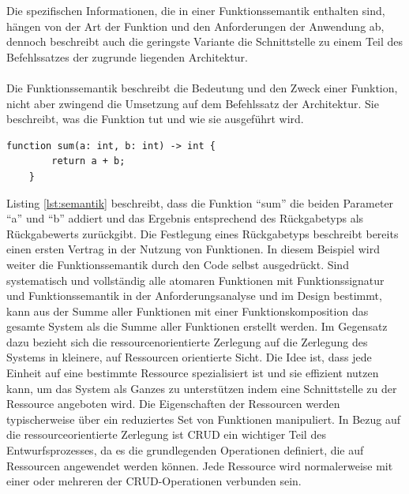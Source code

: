 \documentclass[../vs-script-first-v01.tex]{subfiles}
\begin{document}
Die spezifischen Informationen, die in einer Funktionssemantik enthalten sind, hängen von der Art der Funktion und den Anforderungen der Anwendung ab, dennoch beschreibt auch die geringste Variante die Schnittstelle zu einem Teil des Befehlssatzes der zugrunde liegenden Architektur. 
\\\\
Die Funktionssemantik beschreibt die Bedeutung und den Zweck einer Funktion, nicht aber zwingend die Umsetzung auf dem Befehlssatz der Architektur. Sie beschreibt, was die Funktion tut und wie sie ausgeführt wird. 
\begin{lstlisting}[caption={Funktionssemantik},captionpos=b,label={lst:semantik}]
    function sum(a: int, b: int) -> int {
        return a + b;
    }
\end{lstlisting}
Listing \ref{lst:semantik} beschreibt, dass die Funktion \enquote{sum} die beiden Parameter \enquote{a} und \enquote{b} addiert und das Ergebnis entsprechend des Rückgabetyps als Rückgabewerts zurückgibt. Die Festlegung eines Rückgabetyps beschreibt bereits einen ersten Vertrag in der Nutzung von Funktionen. In diesem Beispiel wird weiter die Funktionssemantik durch den Code selbst ausgedrückt. Sind systematisch und vollständig alle atomaren Funktionen mit Funktionssignatur und Funktionssemantik in der Anforderungsanalyse und im Design bestimmt, kann aus der Summe aller Funktionen mit einer Funktionskomposition das gesamte System als die Summe aller Funktionen erstellt werden. 
Im Gegensatz dazu bezieht sich die ressourcenorientierte Zerlegung auf die Zerlegung des Systems in kleinere, auf Ressourcen orientierte Sicht. Die Idee ist, dass jede Einheit auf eine bestimmte Ressource spezialisiert ist und sie effizient nutzen kann, um das System als Ganzes zu unterstützen indem eine Schnittstelle zu der Ressource angeboten wird. Die Eigenschaften der Ressourcen werden typischerweise über ein reduziertes Set von Funktionen manipuliert.  In Bezug auf die ressourceorientierte Zerlegung ist CRUD ein wichtiger Teil des Entwurfsprozesses, da es die grundlegenden Operationen definiert, die auf Ressourcen angewendet werden können. Jede Ressource wird normalerweise mit einer oder mehreren der CRUD-Operationen verbunden sein.
\end{document}
